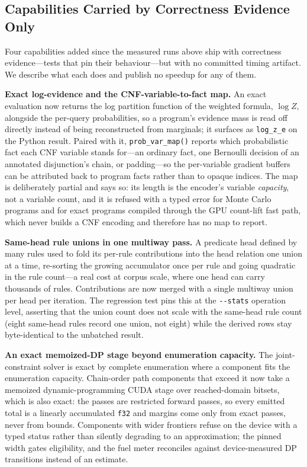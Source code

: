 \subsection{Capabilities Carried by Correctness Evidence Only}\label{sec:noquant}

Four capabilities added since the measured runs above ship with correctness evidence---tests that pin their behaviour---but with no committed timing artifact. We describe what each does and publish no speedup for any of them.

\textbf{Exact log-evidence and the CNF-variable-to-fact map.} An exact evaluation now returns the log partition function of the weighted formula, $\log Z$, alongside the per-query probabilities, so a program's evidence mass is read off directly instead of being reconstructed from marginals; it surfaces as \texttt{log\_z\_e} on the Python result. Paired with it, \texttt{prob\_var\_map()} reports which probabilistic fact each CNF variable stands for---an ordinary fact, one Bernoulli decision of an annotated disjunction's chain, or padding---so the per-variable gradient buffers can be attributed back to program facts rather than to opaque indices. The map is deliberately partial and says so: its length is the encoder's variable \emph{capacity}, not a variable count, and it is refused with a typed error for Monte Carlo programs and for exact programs compiled through the GPU count-lift fast path, which never builds a CNF encoding and therefore has no map to report.

\textbf{Same-head rule unions in one multiway pass.} A predicate head defined by many rules used to fold its per-rule contributions into the head relation one union at a time, re-sorting the growing accumulator once per rule and going quadratic in the rule count---a real cost at corpus scale, where one head can carry thousands of rules. Contributions are now merged with a single multiway union per head per iteration. The regression test pins this at the \texttt{-{}-stats} operation level, asserting that the union count does not scale with the same-head rule count (eight same-head rules record one union, not eight) while the derived rows stay byte-identical to the unbatched result.

\textbf{An exact memoized-DP stage beyond enumeration capacity.} The joint-constraint solver is exact by complete enumeration where a component fits the enumeration capacity. Chain-order path components that exceed it now take a memoized dynamic-programming CUDA stage over reached-domain bitsets, which is also exact: the passes are restricted forward passes, so every emitted total is a linearly accumulated \texttt{f32} and margins come only from exact passes, never from bounds. Components with wider frontiers refuse on the device with a typed status rather than silently degrading to an approximation; the pinned width gates eligibility, and the fuel meter reconciles against device-measured DP transitions instead of an estimate.

